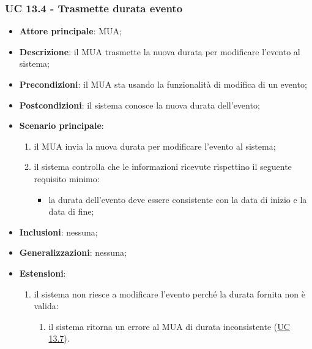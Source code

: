    \subsubsection{UC 13.4 - Trasmette durata evento} \label{sec:UC13.4}
    \begin{itemize}
        \item \textbf{Attore principale}: MUA;
        \item \textbf{Descrizione}: il MUA trasmette la nuova durata per modificare l'evento al sistema;
        \item \textbf{Precondizioni}: il MUA sta usando la funzionalità di modifica di un evento;
        \item \textbf{Postcondizioni}: il sistema conosce la nuova durata dell'evento;
        \item \textbf{Scenario principale}:
            \begin{enumerate}
                \item il MUA invia la nuova durata per modificare l'evento al sistema;
                \item il sistema controlla che le informazioni ricevute rispettino il seguente requisito minimo:
                    \begin{itemize}
                        \item la durata dell'evento deve essere consistente con la data di inizio e la data di fine;
                    \end{itemize}
            \end{enumerate}
        \item \textbf{Inclusioni}: nessuna;
        \item \textbf{Generalizzazioni}: nessuna;
        \item \textbf{Estensioni}:
            \begin{enumerate}[label=\alph*.]
                \item il sistema non riesce a modificare l'evento perché la durata fornita non è valida:
                \begin{enumerate}[label=\arabic*.]
                    \item il sistema ritorna un errore al MUA di durata inconsistente (\hyperref[sec:UC13.7]{UC 13.7}).
                \end{enumerate}
            \end{enumerate}
    \end{itemize}


